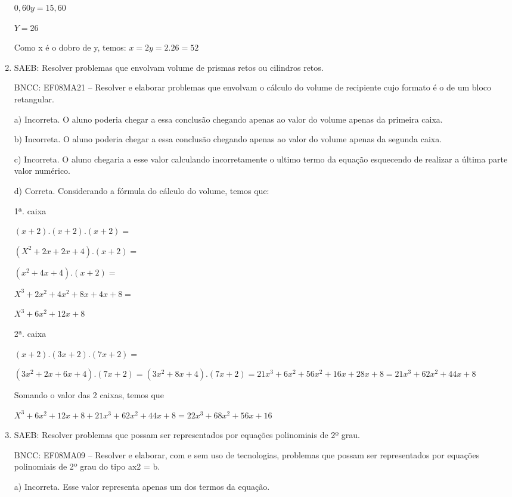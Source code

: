 \begin{enumerate}
$0,60y = 15,60$

$Y = 26$

Como x é o dobro de y, temos: $x = 2y = 2 . 26 = 52$

\item SAEB: Resolver problemas que envolvam volume de prismas retos ou
cilindros retos.

BNCC: EF08MA21 -- Resolver e elaborar problemas que envolvam o cálculo
do volume de recipiente cujo formato é o de um bloco retangular.

a) Incorreta. O aluno poderia chegar a essa conclusão chegando apenas ao
valor do volume apenas da primeira caixa.

b) Incorreta. O aluno poderia chegar a essa conclusão chegando apenas ao
valor do volume apenas da segunda caixa.

c) Incorreta. O aluno chegaria a esse valor calculando incorretamente o ultimo
termo da equação esquecendo de realizar a última parte valor numérico.

d) Correta. Considerando a fórmula do cálculo do volume, temos
que:

1ª. caixa

$(x+2) . (x+2) . (x+2) =$

$(X^2 + 2x + 2x + 4) . (x + 2) =$

$(x^2 + 4x + 4) . (x + 2) =$

$X^3 + 2x^2 + 4x^2 + 8x + 4x + 8 =$

$X^3 + 6x^2 + 12x + 8$

2ª. caixa

$(x + 2) . (3x + 2) . (7x + 2)=$

$(3x^2 +2x + 6x + 4) . (7x + 2)=

(3x^2 + 8x + 4 ) . (7x + 2)=

21x^3 + 6x^2 + 56x^2 + 16x + 28x + 8=

21x^3 + 62x^2 + 44x + 8$

Somando o valor das 2 caixas, temos que

$X^3 + 6x^2 + 12x +8 + 21x^3 + 62x^2 + 44x + 8 =

22x^3 + 68x^2 + 56x + 16$

\item SAEB: Resolver problemas que possam ser representados por equações
polinomiais de 2º grau.

BNCC: EF08MA09 -- Resolver e elaborar, com e sem uso de tecnologias,
problemas que possam ser representados por equações polinomiais de 2º
grau do tipo ax2 = b.

a) Incorreta. Esse valor representa apenas um dos termos da
equação.


\end{enumerate}
